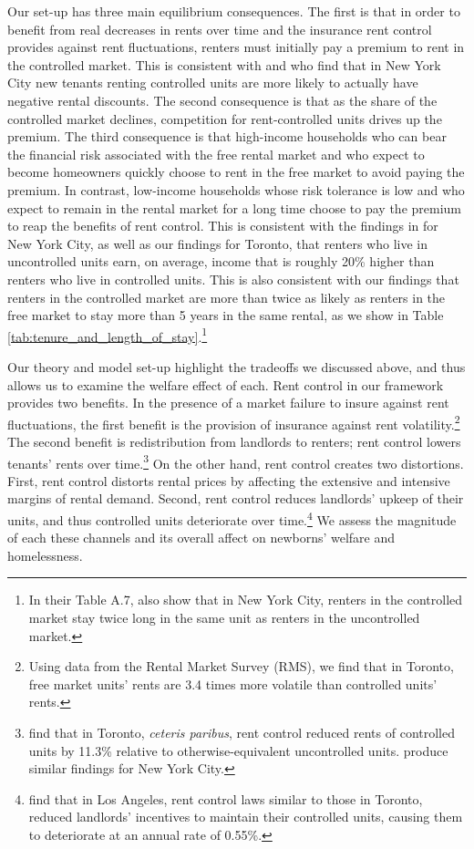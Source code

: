 \documentclass[parskip=full]{article}
\begin{document}
Our set-up has three main equilibrium consequences. The first is that in order to benefit from real decreases in rents over time and the insurance rent control provides against rent fluctuations, renters must initially pay a premium to rent in the controlled market. This is consistent with \citet{early-2000} and \citet{cjq-2023} who find that in New York City new tenants renting controlled units are more likely to actually have negative rental discounts. The second consequence is that as the share of the controlled market declines, competition for rent-controlled units drives up the premium. The third consequence is that high-income households who can bear the financial risk associated with the free rental market and who expect to become homeowners quickly choose to rent in the free market to avoid paying the premium. In contrast, low-income households whose risk tolerance is low and who expect to remain in the rental market for a long time choose to pay the premium to reap the benefits of rent control. This is consistent with the findings in \citet{gl-2003} for New York City, as well as our findings for Toronto, that renters who live in uncontrolled units earn, on average, income that is roughly 20\% higher than renters who live in controlled units. This is also consistent with our findings that renters in the controlled market are more than twice as likely as renters in the free market to stay more than 5 years in the same rental, as we show in Table \ref{tab:tenure_and_length_of_stay}.\footnote{In their Table A.7, \citet{cjq-2023} also show that in New York City, renters in the controlled market stay twice long in the same unit as renters in the uncontrolled market.}

Our theory and model set-up highlight the tradeoffs we discussed above, and thus allows us to examine the welfare effect of each. Rent control in our framework provides two benefits. In the presence of a market failure to insure against rent fluctuations, the first benefit is the provision of insurance against rent volatility.\footnote{Using data from the Rental Market Survey (RMS), we find that in Toronto, free market units' rents are 3.4 times more volatile than controlled units' rents.} The second benefit is redistribution from landlords to renters; rent control lowers tenants' rents over time.\footnote{\citet{zhang-gou} find that in Toronto, \textsl{ceteris paribus}, rent control reduced rents of controlled units by 11.3\% relative to otherwise-equivalent uncontrolled units. \citet{cjq-2023} produce similar findings for New York City.} On the other hand, rent control creates two distortions. First, rent control distorts rental prices by affecting the extensive and intensive margins of rental demand. Second, rent control reduces landlords' upkeep of their units, and thus controlled units deteriorate over time.\footnote{\citet{murray_et_al-1991} find that in Los Angeles, rent control laws similar to those in Toronto, reduced landlords' incentives to maintain their controlled units, causing them to deteriorate at an annual rate of 0.55\%.} We assess the magnitude of each these channels and its overall affect on newborns' welfare and homelessness.
\end{document}
